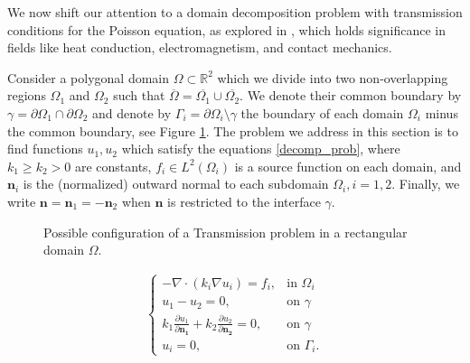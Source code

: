 \documentclass[5p,authoryear]{elsarticle}
\begin{document}
We now shift our attention to a domain decomposition problem with transmission conditions for the Poisson equation, as explored in \cite{gustafsson2019error}, which holds significance in fields like heat conduction, electromagnetism, and contact mechanics.

Consider a polygonal domain \(\Omega \subset \mathbb{R}^2\) which we divide into two non-overlapping regions \(\Omega_1\) and \(\Omega_2\) such that \(\overline{\Omega} = \overline{\Omega_1} \cup \overline{\Omega_2}\). We denote their common boundary by \(\gamma = \partial\Omega_1 \cap \partial\Omega_2\) and denote by \(\Gamma_i = \partial\Omega_i\setminus{\gamma}\) the boundary of each domain \(\Omega_i\) minus the common boundary, see Figure \ref{transmission_problem_figure}. The problem we address in this section is to find functions \(u_1, u_2\) which satisfy the equations \eqref{decomp_prob}, where \(k_1 \geq k_2 > 0\) are constants, \(f_i \in L^2(\Omega_i)\) is a source function on each domain, and \(\boldsymbol{n}_i\) is the (normalized) outward normal to each subdomain \(\Omega_i, i=1, 2\). Finally, we write \(\boldsymbol{n}=\boldsymbol{n}_1=-\boldsymbol{n}_2\) when \(\boldsymbol{n}\) is restricted to the interface \(\gamma\).
\begin{figure}
    \centering
    \caption{Possible configuration of a Transmission problem in a rectangular domain \(\Omega\).}
    \label{transmission_problem_figure}
\end{figure}
\begin{align}\label{decomp_prob}
    \begin{cases}
        - \nabla \cdot \left(k_i \nabla u_i\right) = f_i, & \text{in }\Omega_i\\
        u_1 - u_2 = 0, & \text{on }\gamma\\
        k_1 \frac{\partial u_1}{\partial \mathbf{n_1}} + k_2 \frac{\partial u_2}{\partial  \mathbf{n_2}} = 0, & \text{on }\gamma\\
        u_i = 0, & \text{on }\Gamma_i.
    \end{cases}
\end{align}
\end{document}
